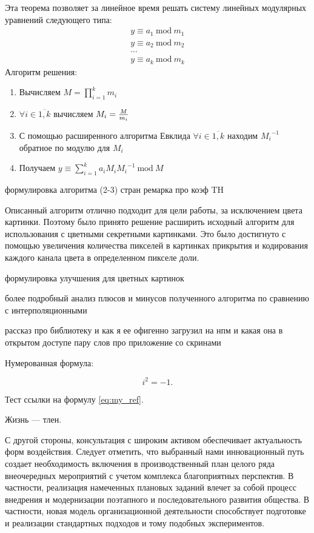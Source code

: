 \documentclass[a4paper,article,14pt]{extarticle}
\newcommand{\Mod}[1]{\ \mathrm{mod}\ #1}
\begin{document}
Эта теорема позволяет за линейное время решать систему линейных модулярных уравнений следующего типа:
\begin{gather}
    y \equiv a_1 \Mod m_1 \\
    y \equiv a_2 \Mod m_2 \\
    ... \\
    y \equiv a_k \Mod m_k
\end{gather}
Алгоритм решения:
\begin{enumerate}
    \item Вычисляем $M=\prod\limits_{i = 1}^k m_i$
    \item $\forall i\in \overline{1,k}$ вычисляем $M_i={{M} \over {m_i}}$
    \item С помощью расширенного алгоритма Евклида $\forall i\in \overline{1,k}$ находим ${M_i}^{-1}$ обратное по модулю для $M_i$
    \item Получаем $y \equiv \sum\limits_{i=1}^k a_i M_i {M_i}^{-1} \Mod M$
\end{enumerate}


формулировка алгоритма (2-3) стран
ремарка про коэф TH


Описанный алгоритм отлично подходит для цели работы, за исключением цвета картинки. Поэтому
было принято решение расширить исходный алгоритм для использования с цветными секретными картинками. 
Это было достигнуто с помощью увеличения количества пикселей в картинках прикрытия и кодирования каждого канала цвета 
в определенном пикселе доли.

формулировка улучшения для цветных картинок

более подробный анализ плюсов и минусов полученного алгоритма по сравнению с интерполяционными

рассказ про библиотеку и как я ее офигенно загрузил на нпм и какая она в открытом доступе
пару слов про приложение со скринами




Нумерованная формула:

\begin{equation}
    i^2 = -1.
    \label{eq:my_ref}
\end{equation}

Тест ссылки на формулу \ref{eq:my_ref}.


Жизнь --- тлен.
\pagebreak


С другой стороны, консультация с широким активом обеспечивает актуальность форм воздействия. Следует отметить, что выбранный нами инновационный путь создает необходимость включения в производственный план целого ряда внеочередных мероприятий с учетом комплекса благоприятных перспектив. В частности, реализация намеченных плановых заданий влечет за собой процесс внедрения и модернизации поэтапного и последовательного развития общества. В частности, новая модель организационной деятельности способствует подготовке и реализации стандартных подходов и тому подобных экспериментов.
\end{document}
